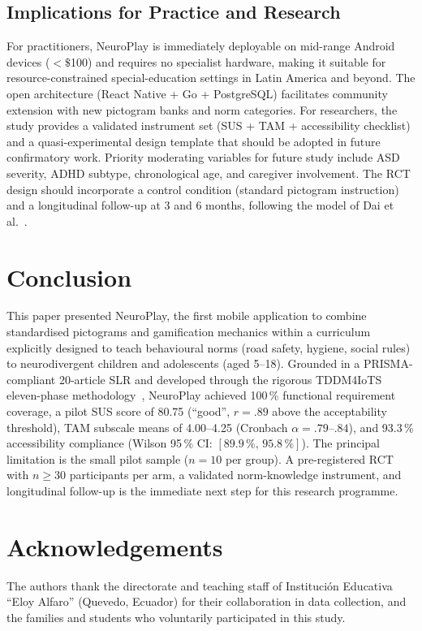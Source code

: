 \documentclass[preprint,12pt]{elsarticle}
\begin{document}
        \subsection{Implications for Practice and Research}
            For practitioners, NeuroPlay is immediately deployable on mid-range Android devices ($<\$$100) and requires no specialist hardware, making it suitable for resource-constrained special-education settings in Latin America and beyond. The open architecture (React Native + Go + PostgreSQL) facilitates community extension with new pictogram banks and norm categories. For researchers, the study provides a validated instrument set (SUS + TAM + accessibility checklist) and a quasi-experimental design template that should be adopted in future confirmatory work. Priority moderating variables for future study include ASD severity, ADHD subtype, chronological age, and caregiver involvement. The RCT design should incorporate a control condition (standard pictogram instruction) and a longitudinal follow-up at 3 and 6 months, following the model of Dai et al.~\cite{Dai2025}.
    
    \section{Conclusion}
    \label{sec:conclusion}
        This paper presented NeuroPlay, the first mobile application to combine standardised pictograms and gamification mechanics within a curriculum explicitly designed to teach behavioural norms (road safety, hygiene, social rules) to neurodivergent children and adolescents (aged 5--18). Grounded in a PRISMA-compliant 20-article SLR and developed through the rigorous TDDM4IoTS eleven-phase methodology~\cite{Guerrero2020,GuerreroIEEE2025}, NeuroPlay achieved 100\,\% functional requirement coverage, a pilot SUS score of 80.75 (``good'', $r = .89$ above the acceptability threshold), TAM subscale means of 4.00--4.25 (Cronbach $\alpha = .79$--$.84$), and 93.3\,\% accessibility compliance (Wilson 95\,\% CI: $[89.9\,\%,\,95.8\,\%]$). The principal limitation is the small pilot sample ($n = 10$ per group). A pre-registered RCT with $n \geq 30$ participants per arm, a validated norm-knowledge instrument, and longitudinal follow-up is the immediate next step for this research programme.
    
    \section*{Acknowledgements}
        The authors thank the directorate and teaching staff of Instituci\'on Educativa ``Eloy Alfaro'' (Quevedo, Ecuador) for their collaboration in data collection, and the families and students who voluntarily participated in this study.
    
\end{document}
